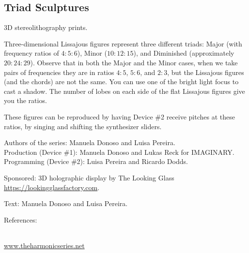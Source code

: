\subsection{Triad Sculptures}
3D stereolithography prints.

Three-dimensional Lissajous figures represent three different triads: Major (with frequency ratios of $4:5:6$), Minor ($10:12:15$), and Diminished (approximately $20:24:29$). Observe that in both the Major and the Minor cases, when we take pairs of frequencies they are in ratios $4:5$, $5:6$, and $2:3$, but the Lissajous figures (and the chords) are not the same. You can use one of the bright light focus to cast a shadow. The number of lobes on each side of the flat Lissajous figures give you the ratios.

These figures can be reproduced by having Device \#2 receive pitches at these ratios, by singing and shifting the synthesizer sliders.

\begin{sectcredits}

\item[Authors of the series:] Manuela Donoso and Luisa Pereira.\\
Production (Device \#1): Manuela Donoso and Lukas Reck for IMAGINARY.\\
Programming (Device \#2): Luisa Pereira and Ricardo Dodds.

\item[Sponsored:] 3D holographic display by The Looking Glass \\
\url{https://lookingglassfactory.com}.

\item[Text:] Manuela Donoso and Luisa Pereira.

\item[References:] \strut \\
\url{www.theharmonicseries.net}

\end{sectcredits}

